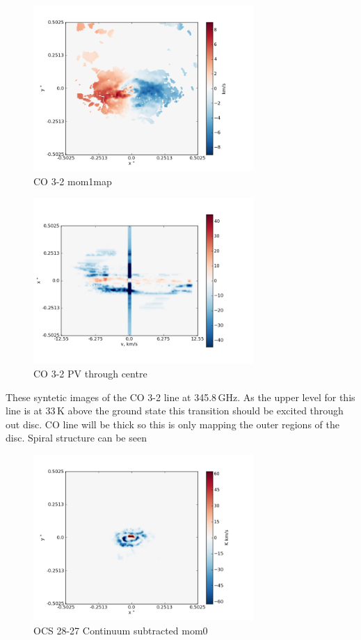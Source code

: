 \documentclass[useAMS,usenatbib]{mn2e}
\begin{document}
\begin{figure}
 \includegraphics[width=84mm]{Figures/sim/imageCO_3-2_30deg_mom1.png}

 \caption{CO 3-2 mom1map}
\end{figure}

\begin{figure}
 \includegraphics[width=84mm]{Figures/sim/imageCO_3-2_30deg_PV_centre.png}

 \caption{CO 3-2 PV through centre}
\end{figure}

These syntetic images of the CO 3-2 line at 345.8$\,$GHz. As the upper level for this line is at 33$\,$K above the ground state this transition should be excited through out disc. CO line will be thick so this is only mapping the outer regions of the disc. Spiral structure can be seen 



\begin{figure}
 \includegraphics[width=84mm]{Figures/sim/imageOCS_28-27_30deg_contSub.png}

 \caption{OCS 28-27 Continuum subtracted mom0}
\end{figure}
\end{document}

